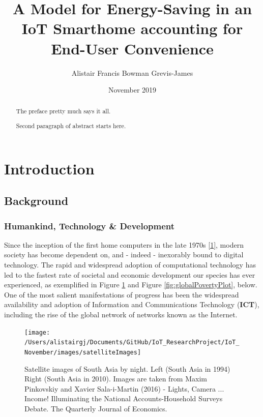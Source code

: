 \documentclass[11pt,]{article}
\title{A Model for Energy-Saving in an IoT Smarthome accounting for End-User
Convenience}
\author{Alistair Francis Bowman Grevis-James}
\date{November 2019}
\begin{document}
\maketitle
\begin{abstract}
The preface pretty much says it all.

\par

Second paragraph of abstract starts here. \pagebreak
\end{abstract}

{
\setcounter{tocdepth}{3}
\tableofcontents
}
\pagebreak

\hypertarget{introduction}{%
\section{Introduction}\label{introduction}}

\hypertarget{background}{%
\subsection{Background}\label{background}}

\hypertarget{humankind-technology-development}{%
\subsubsection{Humankind, Technology \&
Development}\label{humankind-technology-development}}

Since the inception of the first home computers in the late 1970s
{[}\protect\hyperlink{ref-pressAltairHistoryPersonal1993}{1}{]}, modern
society has become dependent on, and - indeed - inexorably bound to
digital technology. The rapid and widespread adoption of computational
technology has led to the fastest rate of societal and economic
development our species has ever experienced, as exemplified in Figure
\ref{fig:satelliteImagesAsia} and Figure \ref{fig:globalPovertyPlot},
below. One of the most salient manifestations of progress has been the
widespread availability and adoption of Information and Communications
Technology (\textbf{ICT}), including the rise of the global network of
networks known as the Internet.

\begin{figure}[H]

{\centering \texttt{[image: /Users/alistairgj/Documents/GitHub/IoT\_ResearchProject/IoT\_November/images/satelliteImages]} 

}

\caption{Satellite images of South Asia by night. Left (South Asia in 1994) Right (South Asia in 2010). Images are taken from Maxim Pinkovskiy and Xavier Sala-i-Martin (2016) - Lights, Camera ... Income! Illuminating the National Accounts-Household Surveys Debate. The Quarterly Journal of Economics.}\label{fig:satelliteImagesAsia}
\end{figure}
\end{document}
